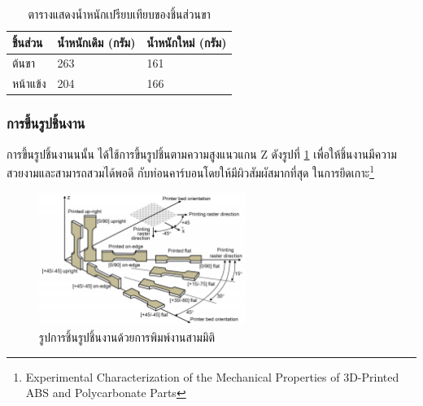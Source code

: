 \begin{table}[!ht]
	\centering
	\begin{tabular}{| l | l | l |}
		\hline
		ชิ้นส่วน & น้ำหนักเดิม (กรัม) & น้ำหนักใหม่ (กรัม) \\
        \hline
        ต้นขา & 263 & 161\\
        หน้าแข้ง & 204 & 166\\
	    \hline
	\end{tabular}
	\caption{ตารางแสดงน้ำหนักเปรียบเทียบของชิ้นส่วนขา}
	\label{tab:UTHAI_leg_compilation}
\end{table}  

\clearpage
\subsubsection*{การขึ้นรูปชิ้นงาน}
การขึ้นรูปชิ้นงานนนั้น ได้ใช้การขึ้นรูปชิ้นตามความสูงแนวแกน Z ดังรูปที่ \ref{fig:print_axis} เพื่อให้ชิ้นงานมีความสวยงามและสามารถสวมได้พอดี
กับท่อนคาร์บอนโดยให้มีผิวสัมผัสมากที่สุด ในการยึดเกาะ\footnote{Experimental Characterization of the Mechanical Properties of 3D-Printed ABS and Polycarbonate Parts}
\begin{figure}[!ht]
    \centering
    \includegraphics[width=0.6\textwidth]{chapter4/images/print_axis.png}
    \caption{รูปการชิ้นรูปชิ้นงานด้วยการพิมพ์งานสามมิติ }
    \label{fig:print_axis}
\end{figure}

